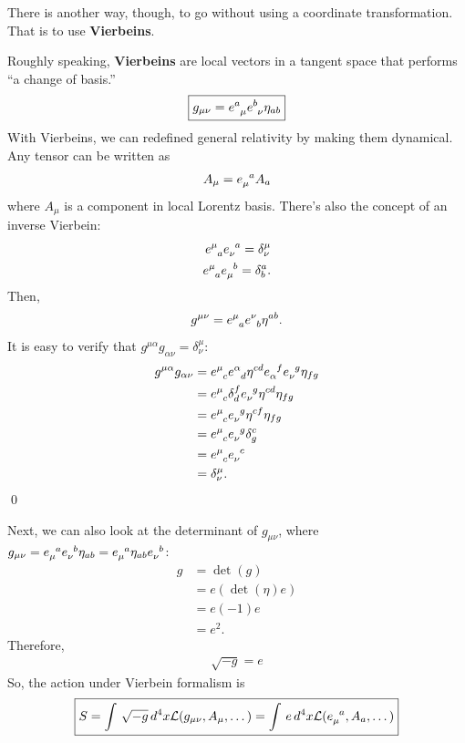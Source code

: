 \documentclass{book}
\numberwithin{equation}{section}
\theoremstyle{definition}
\newcommand{\lag}{\mathcal{L}}
\newcommand{\lp}{\left(}
\newcommand{\rp}{\right)}
\begin{document}
There is another way, though, to go without using a coordinate transformation. That is to use \textbf{Vierbeins}. 

Roughly speaking, \textbf{Vierbeins} are local vectors in a tangent space that performs ``a change of basis.''
\begin{align}
\boxed{g_{\mu\nu} = \tensor{e}{^a_\mu}\tensor{e}{^b_\nu}\eta_{ab}}
\end{align}
With Vierbeins, we can redefined general relativity by making them dynamical. Any tensor can be written as
\begin{align}
A_\mu = \tensor{e}{_\mu^a}A_a
\end{align}
where $A_\mu$ is a component in local Lorentz basis. There's also the concept of an inverse Vierbein:
\begin{align}
\tensor{e}{^\mu_a}\tensor{e}{_\nu^a} = \delta^\mu_\nu\\
\tensor{e}{^\mu_a}\tensor{e}{_\mu^b} = \delta^a_b.
\end{align}
Then, 
\begin{align}
g^{\mu\nu} = \tensor{e}{^\mu_a}\tensor{e}{^\nu_b}\eta^{ab}.
\end{align}
It is easy to verify that $g^{\mu\alpha}g_{\alpha\nu} = \delta^\mu_\nu$:
\begin{align}
g^{\mu\alpha}g_{\alpha\nu} &= \tensor{e}{^\mu_c}\tensor{e}{^\alpha_d}\eta^{cd}\tensor{e}{_\alpha^f}\tensor{e}{_\nu^g}\eta_{fg}\\
&= \tensor{e}{^\mu_c}\delta_d^f\tensor{e}{_\nu^g}\eta^{cd}\eta_{fg}\\
&= \tensor{e}{^\mu_c}\tensor{e}{_\nu^g}\eta^{cf}\eta_{fg}\\
&= \tensor{e}{^\mu_c}\tensor{e}{_\nu^g}\delta^c_g\\
&= \tensor{e}{^\mu_c}\tensor{e}{_\nu^c}\\
&= \delta^\mu_\nu.
\end{align}\qed

Next, we can also look at the determinant of $g_{\mu\nu}$, where $g_{\mu\nu} = \tensor{e}{_\mu^a}\tensor{e}{_\nu^b}\eta_{ab} = \tensor{e}{_\mu^a}\eta_{ab}\tensor{e}{_\nu^b}$:
\begin{align}
g &= \det(g) \\
&= e \lp \det(\eta) e \rp\\
&= e (-1) e\\
&= e^2.
\end{align}
Therefore,
\begin{align}
\boxed{\sqrt{-g} = e}
\end{align}
So, the action under Vierbein formalism is
\begin{align}
\boxed{S = \int\,\sqrt{-g}\,d^4x \lag(g_{\mu\nu}, A_\mu ,\dots) = \int\,e\,d^4x\lag(\tensor{e}{_\mu^a}, A_a,\dots)}
\end{align}
\end{document}
